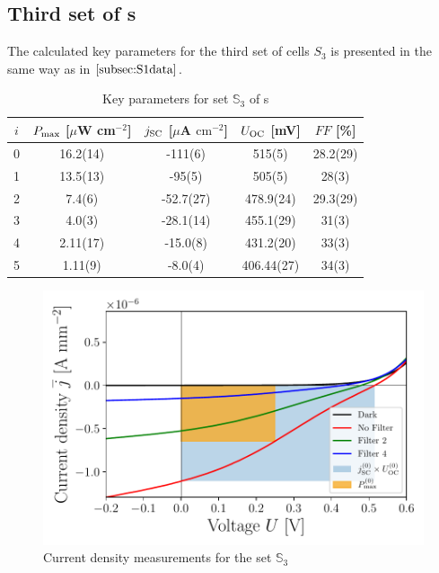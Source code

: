 \documentclass[a4paper,10pt,twocolumn]{article}
\begin{document}
\begin{extract*}
\subsection{Third set of \BHSC s}

The calculated key parameters for the third set of cells $S_3$ is presented in the same way as in $\ref{subsec:S1data}$.

\begin{table}[h]\centering
	\caption{Key parameters for set $\mathbb{S}_3$ of \BHSC s}
	\label{tab:keyparams3}
	\begin{tabular}{@{}ccccc@{}}\toprule
		$i$ & $P_{\text{max}}$ [$\mu$W cm$^{-2}$] & $j_{\text{SC}}$ [$\mu$A $\mathrm{cm}^{-2}$] & $U_{\text{OC}}$ [mV] & $FF$ [\%]\\\midrule
		0 &   16.2(14)  &  -111(6)  & 515(5) & 28.2(29) \\
		1 &   13.5(13)  &  -95(5)  & 505(5) & 28(3) \\
		2 &   7.4(6)  &  -52.7(27)  & 478.9(24) & 29.3(29) \\
		3 &   4.0(3)  &  -28.1(14)  & 455.1(29) & 31(3) \\
		4 &   2.11(17)  &  -15.0(8)  & 431.2(20) & 33(3)\\
		5 &  1.11(9)  &  -8.0(4)  & 406.44(27) & 34(3) \\\bottomrule
	\end{tabular}
\end{table}

\begin{figure}[h]\centering
	\includegraphics[width=\columnwidth]{../../../IV-Curve-Analysis/OSC2Graph.pdf}
	\caption{Current density measurements for the set $\mathbb{S}_3$}
	\label{fig:OSC3Graph}
\end{figure}


\end{extract*}
\end{document}
